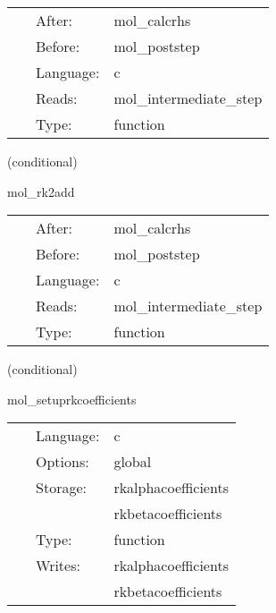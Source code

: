 \hspace{5mm}{\it updates calculated with the euler method } 


\hspace{5mm}

 \begin{tabular*}{160mm}{cll} 
~ & After:  & mol\_calcrhs \\ 
~ & Before:  & mol\_poststep \\ 
~ & Language:  & c \\ 
~ & Reads:  & mol\_intermediate\_step \\ 
~ & Type:  & function \\ 
\end{tabular*} 


\vspace{5mm}

   (conditional) 

\hspace{5mm} mol\_rk2add 

\hspace{5mm}{\it updates calculated with the efficient runge-kutta 2 method } 


\hspace{5mm}

 \begin{tabular*}{160mm}{cll} 
~ & After:  & mol\_calcrhs \\ 
~ & Before:  & mol\_poststep \\ 
~ & Language:  & c \\ 
~ & Reads:  & mol\_intermediate\_step \\ 
~ & Type:  & function \\ 
\end{tabular*} 


\vspace{5mm}

   (conditional) 

\hspace{5mm} mol\_setuprkcoefficients 

\hspace{5mm}{\it initialize the generic runge-kutta coefficients } 


\hspace{5mm}

 \begin{tabular*}{160mm}{cll} 
~ & Language:  & c \\ 
~ & Options:  & global \\ 
~ & Storage:  & rkalphacoefficients \\ 
~& ~ &rkbetacoefficients\\ 
~ & Type:  & function \\ 
~ & Writes:  & rkalphacoefficients \\ 
~& ~ &rkbetacoefficients\\ 
\end{tabular*} 


